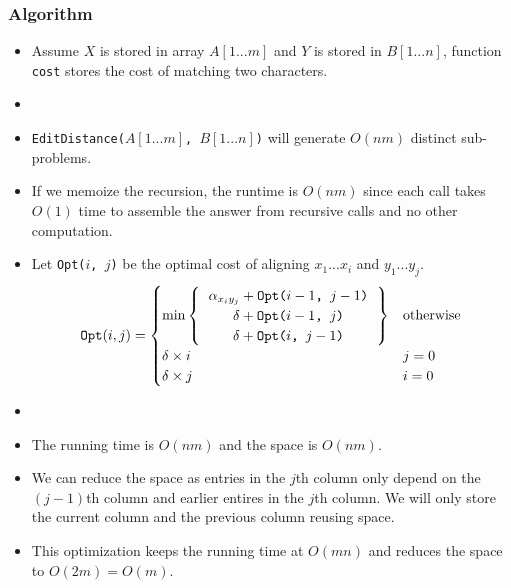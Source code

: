 \subsubsection{Algorithm}
\begin{itemize}
    \item Assume $X$ is stored in array $A[1...m]$ and $Y$ is stored in $B[1...n]$, function \texttt{cost} stores the cost of matching two characters.
    \item[] 
    \item \texttt{EditDistance($A[1...m]$, $B[1...n]$)} will generate $O(nm)$ distinct sub-problems.
    \item If we memoize the recursion, the runtime is $O(nm)$ since each call takes $O(1)$ time to assemble the answer from recursive calls and no other computation.
    \item Let \texttt{Opt($i$, $j$)} be the optimal cost of aligning $x_1...x_i$ and $y_1...y_j$.
    \begin{equation}
        \texttt{Opt}(i, j) = \begin{cases}
            \min \left\{
                \begin{tabular}{c}
                    $\alpha_{x_iy_j} + \texttt{Opt($i - 1$, $j - 1$)}$ \\
                    $\delta + \texttt{Opt($i - 1$, $j$)}$ \\
                    $\delta + \texttt{Opt($i$, $j - 1$)}$ \\
                \end{tabular}
            \right\} & \text{otherwise} \\
            \delta \times i & j = 0 \\
            \delta \times j & i = 0 \\
        \end{cases}
    \end{equation}
    \item[] 
    \item The running time is $O(nm)$ and the space is $O(nm)$.
    \item We can reduce the space as entries in the $j$th column only depend on the $(j - 1)$th column and earlier entires in the $j$th column. We will only store the current column and the previous column reusing space.
    \item This optimization keeps the running time at $O(mn)$ and reduces the space to $O(2m) = O(m)$.
\end{itemize}
